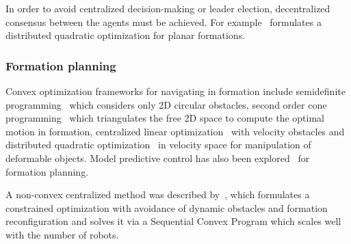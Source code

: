 In order to avoid centralized decision-making or leader election, decentralized consensus between the agents must be achieved. For example~\cite{Montijano:2014bn} formulates a distributed quadratic optimization for planar formations.

\subsubsection{Formation planning}
Convex optimization frameworks for navigating in formation include semidefinite programming~\cite{Derenick:2010cc} which considers only 2D circular obstacles, second order cone programming~\cite{Derenick:ha} which triangulates the free 2D space to compute the optimal motion in formation, centralized linear optimization~\cite{Karamouzas:wm} with velocity obstacles and distributed quadratic optimization~\cite{AlonsoMora:2015wi} in velocity space for manipulation of deformable objects. Model predictive control has also been explored~\cite{Dunbar:2002fh} for formation planning.

A non-convex centralized method was described by~\cite{alonsomora15iros}, which formulates a constrained optimization with avoidance of dynamic obstacles and formation reconfiguration and solves it via a Sequential Convex Program which scales well with the number of robots.










